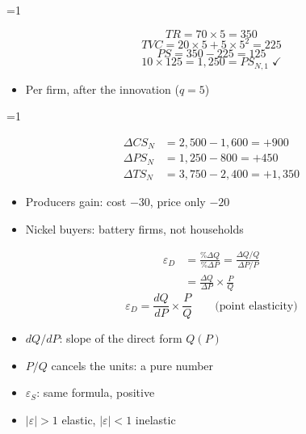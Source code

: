 \documentclass{beamer}
\newcommand{\showanswers}{0}
\begin{document}
\ifnum\showanswers=1
\begin{frame}[plain,label=w2_ans_q22c]
  \Large
  \[
    \tag{M21}\;TR = 70 \times 5 = 350
  \]
  \[
    \tag{M22}\;TVC = 20 \times 5 + 5 \times 5^2 = 225
  \]
  \[
    \tag{M23}\;PS = 350 - 225 = 125
  \]
  \[
    \tag{M24}\;10 \times 125 = 1{,}250 = PS_{N,1} \;\checkmark
  \]

  \vspace{0.3em}
  \begin{itemize}\Large
    \item Per firm, after the innovation ($q = 5$)
  \end{itemize}
\end{frame}
\fi

\ifnum\showanswers=1
\begin{frame}[plain,label=w2_ans_q22b]
  \Large
  \begin{align*}
    \tag{M25}\;\Delta CS_N &= 2{,}500 - 1{,}600 = +900\\
    \tag{M26}\;\Delta PS_N &= 1{,}250 - 800 = +450\\
    \tag{M27}\;\Delta TS_N &= 3{,}750 - 2{,}400 = +1{,}350
  \end{align*}

  \vspace{0.3em}
  \begin{itemize}\Large
    \item Producers gain: cost $-30$, price only $-20$
    \item Nickel buyers: battery firms, not households
  \end{itemize}
\end{frame}
\fi

\begin{frame}[plain,label=w2_wt4_elasticity]
  \Large
  \begin{align*}
    \tag{12}\;\varepsilon_D &= \frac{\%\Delta Q}{\%\Delta P}
      = \frac{\Delta Q / Q}{\Delta P / P}\\
    &= \frac{\Delta Q}{\Delta P} \times \frac{P}{Q}
  \end{align*}
  \[
    \tag{13}\;\varepsilon_D = \frac{dQ}{dP} \times \frac{P}{Q}
    \qquad \text{(point elasticity)}
  \]

  \vspace{0.3em}
  \begin{itemize}\Large
    \item $dQ/dP$: slope of the direct form $Q(P)$
    \item $P/Q$ cancels the units: a pure number
    \item $\varepsilon_S$: same formula, positive
    \item $|\varepsilon| > 1$ elastic, $|\varepsilon| < 1$ inelastic
  \end{itemize}
\end{frame}
\end{document}
